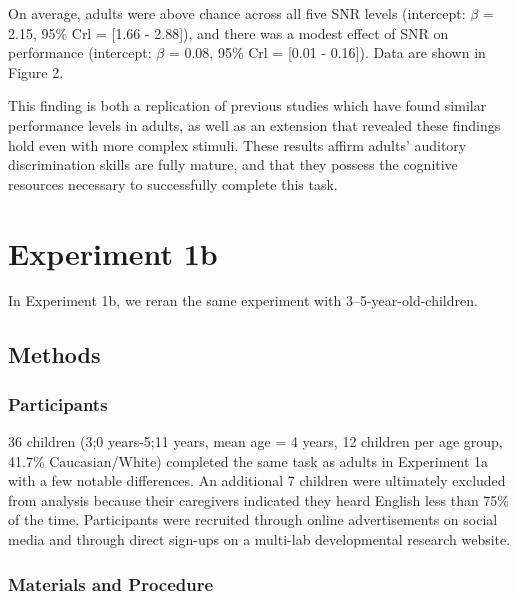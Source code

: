 \documentclass[10pt, letterpaper]{article}
\begin{document}
On average, adults were above chance across all five SNR levels
(intercept: \(\beta\) = 2.15, 95\% Crl = {[}1.66 - 2.88{]}), and there
was a modest effect of SNR on performance (intercept: \(\beta\) = 0.08,
95\% Crl = {[}0.01 - 0.16{]}). Data are shown in Figure 2.

This finding is both a replication of previous studies which have found
similar performance levels in adults, as well as an extension that
revealed these findings hold even with more complex stimuli. These
results affirm adults' auditory discrimination skills are fully mature,
and that they possess the cognitive resources necessary to successfully
complete this task.

\hypertarget{experiment-1b}{%
\section{Experiment 1b}\label{experiment-1b}}

In Experiment 1b, we reran the same experiment with
3--5-year-old-children.

\hypertarget{methods-1}{%
\subsection{Methods}\label{methods-1}}

\hypertarget{participants-1}{%
\subsubsection{Participants}\label{participants-1}}

36 children (3;0 years-5;11 years, mean age = 4 years, 12 children per
age group, 41.7\% Caucasian/White) completed the same task as adults in
Experiment 1a with a few notable differences. An additional 7 children
were ultimately excluded from analysis because their caregivers
indicated they heard English less than 75\% of the time. Participants
were recruited through online advertisements on social media and through
direct sign-ups on a multi-lab developmental research website.

\hypertarget{materials-and-procedure-1}{%
\subsubsection{Materials and
Procedure}\label{materials-and-procedure-1}}
\end{document}

